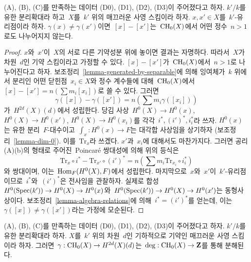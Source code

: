 \begin{lemma}
\label{lemma-relations-classes-points}
(A), (B), (C)를 만족하는 데이터 (D0), (D1), (D2), (D3)이
주어졌다고 하자. $k'/k$를 유한 분리확대라 하고\  $X$를\  $k'$ 위의
매끄러운 사영 스킴이라 하자. $x, x' \in X$를\  $k'$-유리점이라 하자.
$\gamma(x) \not = \gamma(x')$이면\  $[x] - [x']$는\  $\mathop{\mathrm{CH}}\nolimits_0(X)$에서
어떤 정수\  $n > 1$로도 나누어지지 않는다.
\end{lemma}

\begin{proof}
$x$와\  $x'$이\  $X$의 서로 다른 기약성분 위에 놓이면 결과는 자명하다.
따라서\  $X$가 차원\  $d$인 기약 스킴이라고 가정할 수 있다.
$[x] - [x']$가\  $\mathop{\mathrm{CH}}\nolimits_0(X)$에서\  $n > 1$로 나누어진다고 하자. 보조정리\ 
\ref{lemma-generated-by-separable}에 의해 잉여체가\  $k$ 위에서 분리인
어떤 닫힌점\  $x_i \in X$와 정수 계수들에 대해\  $\mathop{\mathrm{CH}}\nolimits_0(X)$에서\ 
$[x] - [x'] = n(\sum m_i [x_i])$로 쓸 수 있다. 그러면
$$
\gamma([x]) - \gamma([x']) = n (\sum m_i \gamma([x_i]))
$$
가\  $H^{2d}(X)(d)$에서 성립한다. 당김 사상\ 
$H^0(X) \to H^0(x)$, $H^0(X) \to H^0(x')$, $H^0(X) \to H^0(x_i)$를
각각\  $i^*, (i')^*, i_i^*$라 쓰자. $H^0(x)$는 유한 분리\ 
$F$-대수이고\  $\int_x : H^0(x) \to F$는 대각합 사상임을 상기하자
(보조정리\  \ref{lemma-dim-0}). 이를\  $\text{Tr}_x$라 쓰겠다.
$x'$과\  $x_i$에 대해서도 마찬가지다. 그러면 공리 (A)(b)의 형태로
주어진\  Poincar\'e 쌍대성에 의해 위의 등식은
$$
\text{Tr}_x \circ i^* - \text{Tr}_{x'} \circ (i')^* =
n(\sum m_i \text{Tr}_{x_i} \circ i_i^*)
$$
와 쌍대이며, 이는\  $\mathop{\mathrm{Hom}}\nolimits_F(H^0(X), F)$에서 성립한다. 마지막으로\ 
$x$와\  $x'$이\  $k'$-유리점이므로\  $i^*$와\  $(i')^*$은 전사임을
관찰하자. 실제로 합성\ 
$H^0(\mathop{\mathrm{Spec}}(k')) \to H^0(X) \to H^0(x)$와\ 
$H^0(\mathop{\mathrm{Spec}}(k')) \to H^0(X) \to H^0(x')$는 동형사상이다.
보조정리\  \ref{lemma-algebra-relations}에 의해\  $i^* = (i')^*$를
얻는데, 이는\  $\gamma([x]) \not = \gamma([x'])$라는 가정에
모순된다.
\end{proof}

\begin{lemma}
\label{lemma-classes-points}
(A), (B), (C)를 만족하는 데이터 (D0), (D1), (D2), (D3)이
주어졌다고 하자. $k'/k$를 유한 분리확대라 하자. $X$를\  $k'$ 위의
차원\  $d$인 기하적으로 기약인 매끄러운 사영 스킴이라 하자. 그러면\ 
$\gamma : \mathop{\mathrm{CH}}\nolimits_0(X) \to H^{2d}(X)(d)$는\ 
$\deg : \mathop{\mathrm{CH}}\nolimits_0(X) \to \mathbf{Z}$를 통해 분해된다.
\end{lemma}

